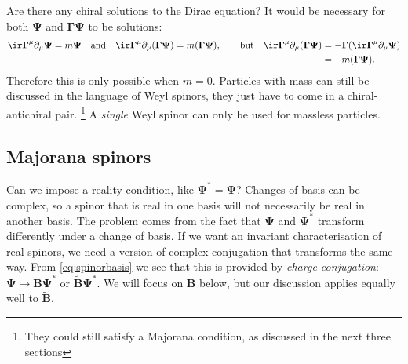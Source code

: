 \documentclass[11pt]{article}
\newcommand{\Gammab}{\boldsymbol{\Gamma}}
\newcommand{\B}{\mathbf{B}}
\newcommand{\Bt}{\widetilde{\B}}
\newcommand{\Psib}{\boldsymbol{\Psi}}
\begin{document}
Are there any chiral solutions to the Dirac equation?
It would be necessary for both $\Psib$ and $\Gammab \Psib$ to be solutions:
%
\begin{equation*}
  \ir \Gammab^\mu \partial_\mu \Psib = m \Psib
  \quad \text{and} \quad
  \ir \Gammab^\mu \partial_\mu (\Gammab \Psib) = m (\Gammab \Psib),
  \qquad \text{but} \quad
\begin{aligned}[t]
  \ir \Gammab^\mu \partial_\mu (\Gammab \Psib)
    &= - \Gammab (\ir \Gammab^\mu \partial_\mu \Psib) \\
    &= - m (\Gammab \Psib).
\end{aligned}
\end{equation*}
%
Therefore this is only possible when $m=0$.
Particles with mass can still be discussed in the language of Weyl spinors, they just have to come in a chiral-antichiral pair.%
\footnote{They could still satisfy a Majorana condition, as discussed in the next three sections}
A \emph{single} Weyl spinor can only be used for massless particles.


\subsection{Majorana spinors}\label{sec:majorana}

Can we impose a reality condition, like $\Psib^\ast = \Psib$?
Changes of basis can be complex, so a spinor that is real in one basis will not necessarily be real in another basis.
The problem comes from the fact that $\Psib$ and $\Psib^\ast$ transform differently under a change of basis.
If we want an invariant characterisation of real spinors, we need a version of complex conjugation that transforms the same way.
From \cref{eq:spinorbasis} we see that this is provided by \emph{charge conjugation}: \( \Psib \to \B \Psib^\ast \) or \( \Bt \Psib^\ast \).
We will focus on $\B$ below, but our discussion applies equally well to $\Bt$.
\end{document}
